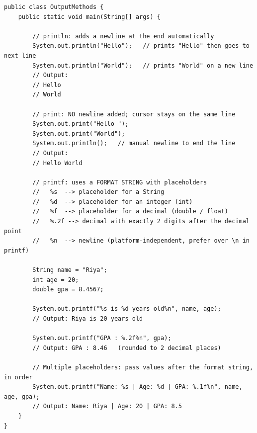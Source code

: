 \documentclass[12pt,a4paper,oneside]{book}
\begin{document}
\begin{lstlisting}[caption={print vs println vs printf --- all three compared}]
public class OutputMethods {
    public static void main(String[] args) {

        // println: adds a newline at the end automatically
        System.out.println("Hello");   // prints "Hello" then goes to next line
        System.out.println("World");   // prints "World" on a new line
        // Output:
        // Hello
        // World

        // print: NO newline added; cursor stays on the same line
        System.out.print("Hello ");
        System.out.print("World");
        System.out.println();   // manual newline to end the line
        // Output:
        // Hello World

        // printf: uses a FORMAT STRING with placeholders
        //   %s  --> placeholder for a String
        //   %d  --> placeholder for an integer (int)
        //   %f  --> placeholder for a decimal (double / float)
        //   %.2f --> decimal with exactly 2 digits after the decimal point
        //   %n  --> newline (platform-independent, prefer over \n in printf)

        String name = "Riya";
        int age = 20;
        double gpa = 8.4567;

        System.out.printf("%s is %d years old%n", name, age);
        // Output: Riya is 20 years old

        System.out.printf("GPA : %.2f%n", gpa);
        // Output: GPA : 8.46   (rounded to 2 decimal places)

        // Multiple placeholders: pass values after the format string, in order
        System.out.printf("Name: %s | Age: %d | GPA: %.1f%n", name, age, gpa);
        // Output: Name: Riya | Age: 20 | GPA: 8.5
    }
}
\end{lstlisting}
\end{document}
